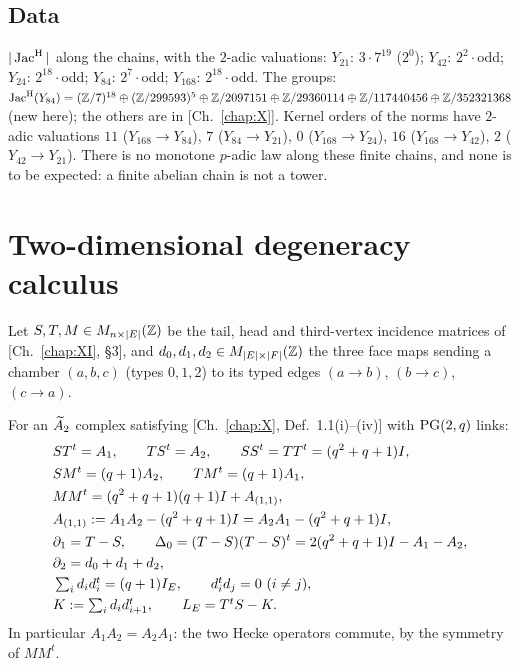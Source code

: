 \subsection*{Data}
$|\operatorname{Jac}^{\mathrm{H}}|$ along the chains, with the $2$-adic valuations: $Y_{21}$: $3\cdot7^{19}$ ($2^{0}$);
$Y_{42}$: $2^{2}\cdot$odd; $Y_{24}$: $2^{18}\cdot$odd; $Y_{84}$: $2^{7}\cdot$odd; $Y_{168}$:
$2^{18}\cdot$odd. The groups: $\operatorname{Jac}^{\mathrm{H}}(Y_{84})=(\mathbb{Z}/7)^{18}\oplus(\mathbb{Z}/299593)^{5}\oplus\mathbb{Z}/2097151
\oplus\mathbb{Z}/29360114\oplus\mathbb{Z}/117440456\oplus\mathbb{Z}/352321368$ (new here); the others are in [Ch.~\ref{chap:X}].
Kernel orders of the norms have $2$-adic valuations $11$ ($Y_{168}\to Y_{84}$), $7$
($Y_{84}\to Y_{21}$), $0$ ($Y_{168}\to Y_{24}$), $16$ ($Y_{168}\to Y_{42}$), $2$
($Y_{42}\to Y_{21}$). There is no monotone $p$-adic law along these finite chains, and none
is to be expected: a finite abelian chain is not a tower.

\section{Two-dimensional degeneracy calculus}\label{XII:sec:calculus}

Let $S,T,M\in M_{n\times|E|}(\mathbb{Z})$ be the tail, head and third-vertex incidence matrices of
[Ch.~\ref{chap:XI}, \S3], and $d_0,d_1,d_2\in M_{|E|\times|F|}(\mathbb{Z})$ the three face maps sending a chamber
$(a,b,c)$ (types $0,1,2$) to its typed edges $(a\to b)$, $(b\to c)$, $(c\to a)$.

\begin{theorem}\label{XII:thm:calculus}
For an $\widetilde A_2$ complex satisfying {\rm[Ch.~\ref{chap:X}, Def.~1.1(i)--(iv)]} with $\mathrm{PG}(2,q)$ links:
\begin{align*}
&ST^{t}=A_1,\qquad TS^{t}=A_2,\qquad SS^{t}=TT^{t}=(q^{2}+q+1)I,\\
&SM^{t}=(q+1)A_2,\qquad TM^{t}=(q+1)A_1,\\
&MM^{t}=(q^{2}+q+1)(q+1)I+A_{(1,1)},\\
&A_{(1,1)}:=A_1A_2-(q^{2}+q+1)I=A_2A_1-(q^{2}+q+1)I,\\
&\partial_1=T-S,\qquad \Delta_0=(T-S)(T-S)^{t}=2(q^{2}+q+1)I-A_1-A_2,\\
&\partial_2=d_0+d_1+d_2,\\
&\textstyle\sum_id_id_i^{t}=(q+1)I_E,\qquad d_i^{t}d_j=0\ (i\ne j),\\
&\textstyle K:=\sum_id_id_{i+1}^{t},\qquad L_E=T^{t}S-K .
\end{align*}
In particular $A_1A_2=A_2A_1$: the two Hecke operators commute, by the symmetry of $MM^{t}$.
\end{theorem}

